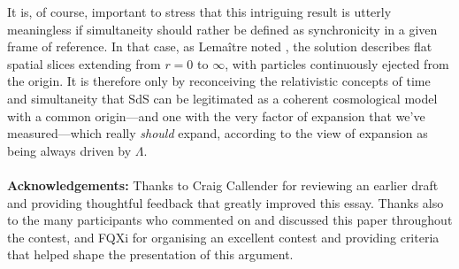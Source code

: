 \documentclass[11pt]{article}
\begin{document}
It is, of course, important to stress that this intriguing result is utterly meaningless if simultaneity should rather be defined as synchronicity in a given frame of reference. In that case, as Lema\^{i}tre noted \cite{Lemaitre1949}, the solution describes flat spatial slices extending from $r=0$ to $\infty$, with particles continuously ejected from the origin. It is therefore only by reconceiving the relativistic concepts of time and simultaneity that SdS can be legitimated as a coherent cosmological model with a common origin---and one with the very factor of expansion that we've measured---which really \textit{should} expand, according to the view of expansion as being always driven by $\Lambda$.
\\\\\textbf{Acknowledgements:} Thanks to Craig Callender for reviewing an earlier draft and providing thoughtful feedback that greatly improved this essay. Thanks also to the many participants who commented on and discussed this paper throughout the contest, and FQXi for organising an excellent contest and providing criteria that helped shape the presentation of this argument.
\end{document}
